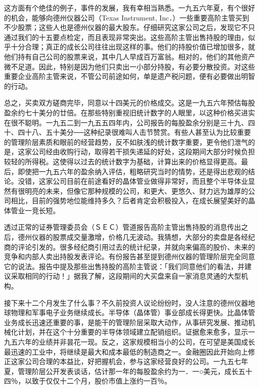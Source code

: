 \documentclass[UTF8,a4paper,zihao=-4,fontset = windows]{ctexart} %
\begin{document}
这方面有个绝佳的例子，事件的发展，我有幸相当熟悉。一九五六年夏，有个很好的机会，能够向德州仪器公司（Texas Instrument, Inc．）一些重要高阶主管买到不少股票；这些人也是德州仪器的最大股东。仔细研究这家公司之后，发现它不只通过我们的十五要点检定，而且表现非常突出。这些高阶主管出售持股的理由，似乎十分合理；真正的成长公司往往出现这样的事。他们的持股价值已增加很多，就他们持有自己公司的股票来说，其中几人早成百万富翁。相对的，他们的其他资产微不足道。因此，特别是因为他们只卖出一小部分持股，有必要分散投资。对这些重要企业高阶主管来说，不管公司前途如何，单是遗产税问题，便有必要做出明智的行动。

总之，买卖双方磋商完毕，同意以十四美元的价格成交。这是一九五六年预估每股盈余约七十美分的廿倍。在那些特别重视旧统计数字的人眼里，以这种价格买进实在很不聪明。一九五二到一九五五四年内，公司报告的每股盈余分别是三十九、四十、四十八、五十美分──这种纪录很难叫人击节赞赏。有些人甚至认为比较重要的管理阶层素质和眼前的经营趋势，反不如肤浅的统计数字重要，更令他们泄气的是，这家公司经由收购行动，取得若干损失递延的好处，这段期间大部分时候负担较轻的所得税。这使得以过去的统计数字为基础，计算出来的价格显得更高。最后，即使把一九五六年的盈余纳入评估，粗略研究当时的情势，还是得出悲观的结论。没错，这家公司目前在前途看好的晶体管业做得非常好，而且整个半导体业显然有很明亮的未来，但像它那种规模的公司，和更大、更悠久、财力远为雄厚的公司相比，目前的强势地位能维持多久？后者肯定会积极投入，在成长展望美好的晶体管业一竞长短。

透过正常的证券管理委员会（ＳＥＣ）管道报告高阶主管出售持股的消息传出之后，德州仪器的股票成交量激增，价格几无波动。我猜想，大部分的卖盘是各经纪商的评论引发的。很多经纪商引用过去的统计纪录，并就向来偏高的股价、未来的竞争和内部人卖出持股发表评论。有份报告甚至提到德州仪器的管理阶层完全同意它的说法。报告中提及那些出售持股的高阶主管说：「我们同意他们的看法，并建议采取相同的行动！」据我了解，这段期间的大买盘来自一家消息灵通的大型机构。

接下来十二个月发生了什么事？不久前投资人议论纷纷时，没人注意的德州仪器地球物理和军事电子业务继续成长。半导体（晶体管）事业部成长得更快。比晶体管业务成长迅速还重要的事，是能干的管理阶层采取大动作，从事研究发展、推动机械化计划，并在这个十分重要的半导体领域建立配销组织。证据愈来愈多，显示一九五六年的业绩并非昙花一现。反之，这家规模相当小的公司，在可望是美国成长最迅速的工业中，将继续是最大和成本最低的制造商之一。金融圈因此开始向上修正这家公司合理的本益比，好把握机会，参与这家经营良好的公司。一九五七年夏，管理阶层公开发表谈话，估计那一年的每股盈余约为一．一○美元，成长五十四％，以致于仅仅十二个月，股价市值上涨约一百％。
\end{document}
